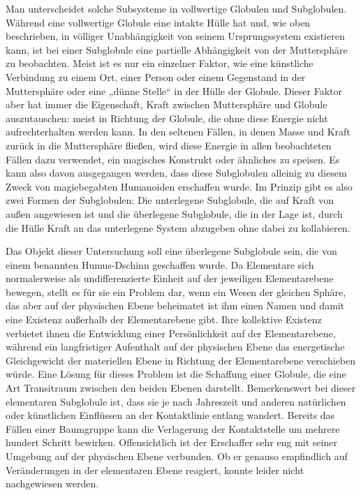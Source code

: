 \documentclass[a5paper,8pt]{book}
\begin{document}
Man unterscheidet solche Subsysteme in vollwertige Globulen und Subglobulen. Während eine vollwertige Globule eine intakte 
Hülle hat und, wie oben beschrieben, in völliger Unabhängigkeit von seinem Ursprungssystem existieren kann, ist bei einer 
Subglobule eine partielle Abhängigkeit von der Muttersphäre zu beobachten. Meist ist es nur ein einzelner Faktor, wie eine 
künstliche Verbindung zu einem Ort, einer Person oder einem Gegenstand in der Muttersphäre oder eine „dünne Stelle“ in der 
Hülle der Globule. Dieser Faktor aber hat immer die Eigenschaft, Kraft zwischen Muttersphäre und Globule auszutauschen: 
meist in Richtung der Globule, die ohne diese Energie nicht aufrechterhalten werden kann. 
In den seltenen Fällen, in denen Masse und Kraft zurück in die Muttersphäre fließen, wird diese Energie in allen 
beobachteten Fällen dazu verwendet, ein magisches Konstrukt oder ähnliches zu speisen. Es kann also davon ausgegangen 
werden, dass diese Subglobulen alleinig zu diesem Zweck von magiebegabten Humanoiden erschaffen wurde. 
Im Prinzip gibt es also zwei Formen der Subglobulen: Die unterlegene Subglobule, die auf Kraft von außen angewiesen ist und 
die überlegene Subglobule, die in der Lage ist, durch die Hülle Kraft an das unterlegene System abzugeben ohne dabei zu 
kollabieren.

Das Objekt dieser Untersuchung soll eine überlegene Subglobule sein, die von einem benannten Humus-Dschinn geschaffen 
wurde. Da Elementare sich normalerweise als undifferenzierte Einheit auf der jeweiligen Elementarebene bewegen, stellt es 
für sie ein Problem dar, wenn ein Wesen der gleichen Sphäre, das aber auf der physischen Ebene beheimatet ist ihm einen 
Namen und damit eine Existenz außerhalb der Elementarebene gibt. Ihre kollektive Existenz verbietet ihnen die Entwicklung 
einer Persönlichkeit auf der Elementarebene, während ein langfristiger Aufenthalt auf der physischen Ebene das energetische 
Gleichgewicht der materiellen Ebene in Richtung der Elementarebene verschieben würde. Eine Lösung für dieses Problem ist 
die Schaffung einer Globule, die eine Art Transitraum zwischen den beiden Ebenen darstellt. 
Bemerkenswert bei dieser elementaren Subglobule ist, dass sie je nach Jahreszeit und anderen natürlichen oder künstlichen 
Einflüssen an der Kontaktlinie entlang wandert. Bereits das Fällen einer Baumgruppe kann die Verlagerung der Kontaktstelle 
um mehrere hundert Schritt bewirken. Offensichtlich ist der Erschaffer sehr eng mit seiner Umgebung auf der physischen 
Ebene verbunden. Ob er genauso empfindlich auf Veränderungen in der elementaren Ebene reagiert, konnte leider nicht 
nachgewiesen werden. 
\end{document}
